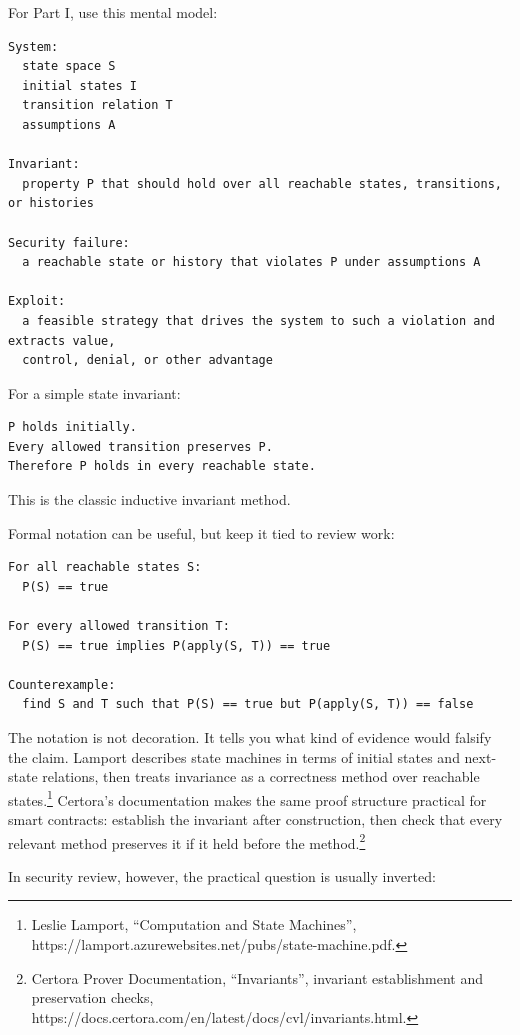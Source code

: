 For Part I, use this mental model:

\begin{lstlisting}
System:
  state space S
  initial states I
  transition relation T
  assumptions A

Invariant:
  property P that should hold over all reachable states, transitions, or histories

Security failure:
  a reachable state or history that violates P under assumptions A

Exploit:
  a feasible strategy that drives the system to such a violation and extracts value,
  control, denial, or other advantage
\end{lstlisting}

For a simple state invariant:

\begin{lstlisting}
P holds initially.
Every allowed transition preserves P.
Therefore P holds in every reachable state.
\end{lstlisting}

This is the classic inductive invariant method.

Formal notation can be useful, but keep it tied to review work:

\begin{lstlisting}
For all reachable states S:
  P(S) == true

For every allowed transition T:
  P(S) == true implies P(apply(S, T)) == true

Counterexample:
  find S and T such that P(S) == true but P(apply(S, T)) == false
\end{lstlisting}

The notation is not decoration. It tells you what kind of evidence would falsify the claim.
 Lamport describes state
machines in terms of initial states and next-state relations, then
treats invariance as a correctness method over reachable
states.\footnote{Leslie Lamport, ``Computation and State Machines'',
  https://lamport.azurewebsites.net/pubs/state-machine.pdf.} Certora's
documentation makes the same proof structure practical for smart
contracts: establish the invariant after construction, then check that
every relevant method preserves it if it held before the
method.\footnote{Certora Prover Documentation, ``Invariants'', invariant
  establishment and preservation checks,
  https://docs.certora.com/en/latest/docs/cvl/invariants.html.}

In security review, however, the practical question is usually inverted:

